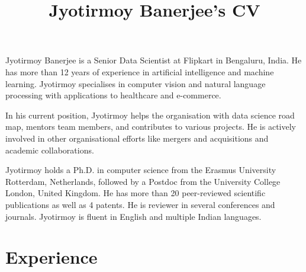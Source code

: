 \documentclass[a4paper,online]{adcv}
\title{Jyotirmoy Banerjee’s CV}
\begin{document}
Jyotirmoy Banerjee is a Senior Data Scientist at Flipkart in Bengaluru, India. He has more than 12 years of experience in artificial intelligence and machine learning.
Jyotirmoy specialises in computer vision and natural language processing with applications to healthcare and e-commerce.

In his current position, Jyotirmoy helps the organisation with data science road map, mentors team members, and contributes to various projects. 
He is actively involved in other organisational efforts like mergers and acquisitions and academic collaborations.

Jyotirmoy holds a Ph.D. in computer science from the Erasmus University Rotterdam, Netherlands, followed by a Postdoc from the University College London, United Kingdom. He has more than 20 peer-reviewed scientific publications as well as 4 patents. He is reviewer in several conferences and journals.
Jyotirmoy is fluent in English and multiple Indian languages.

\section{Experience}
\end{document}
